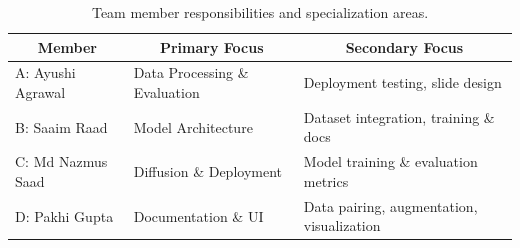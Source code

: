 \documentclass{article} %
\begin{document}
\begin{table}[h]
\caption{Team member responsibilities and specialization areas.}
\label{team-table}
\begin{center}
\begin{tabular}{lll}
\toprule
\multicolumn{1}{c}{\bf Member} &
\multicolumn{1}{c}{\bf Primary Focus} &
\multicolumn{1}{c}{\bf Secondary Focus} \\
\midrule
A: Ayushi Agrawal   & Data Processing \& Evaluation     & Deployment testing, slide design \\
\addlinespace
B: Saaim Raad       & Model Architecture                & Dataset integration, training \& docs \\
\addlinespace
C: Md Nazmus Saad   & Diffusion \& Deployment           & Model training \& evaluation metrics \\
\addlinespace
D: Pakhi Gupta      & Documentation \& UI               & Data pairing, augmentation, visualization \\
\bottomrule
\end{tabular}
\end{center}
\end{table}
\end{document}
